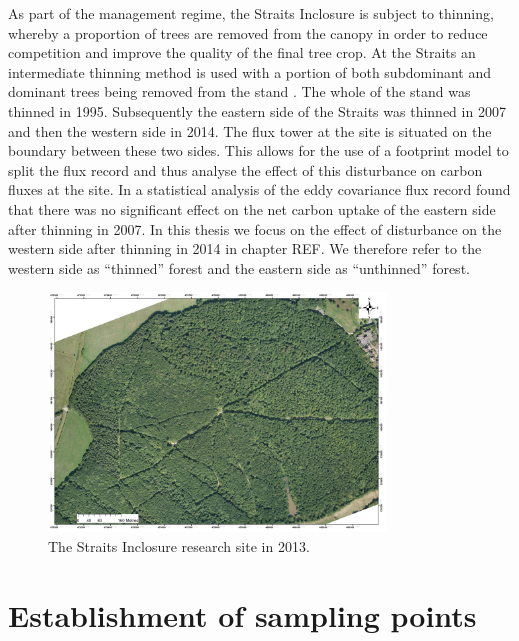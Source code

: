 As part of the management regime, the Straits Inclosure is subject to thinning, whereby a proportion of trees are removed from the canopy in order to reduce competition and improve the quality of the final tree crop. At the Straits an intermediate thinning method is used with a portion of both subdominant and dominant trees being removed from the stand \citep{kerr2011thinning}. The whole of the stand was thinned in 1995. Subsequently the eastern side of the Straits was thinned in 2007 and then the western side in 2014. The flux tower at the site is situated on the boundary between these two sides. This allows for the use of a footprint model to split the flux record and thus analyse the effect of this disturbance on carbon fluxes at the site. In \citet{wilkinson2015effects} a statistical analysis of the eddy covariance flux record found that there was no significant effect on the net carbon uptake of the eastern side after thinning in 2007. In this thesis we focus on the effect of disturbance on the western side after thinning in 2014 in chapter REF. We therefore refer to the western side as ``thinned'' forest and the eastern side as ``unthinned'' forest.   


\begin{figure}[ht]
    \centering
    \includegraphics[width=0.8\textwidth]{chapter/chapter4/AP1_2013.jpg}
    \caption{The Straits Inclosure research site in 2013.} \label{chap4:fig:ah_aerial_photo}
\end{figure}

\section{Establishment of sampling points}

